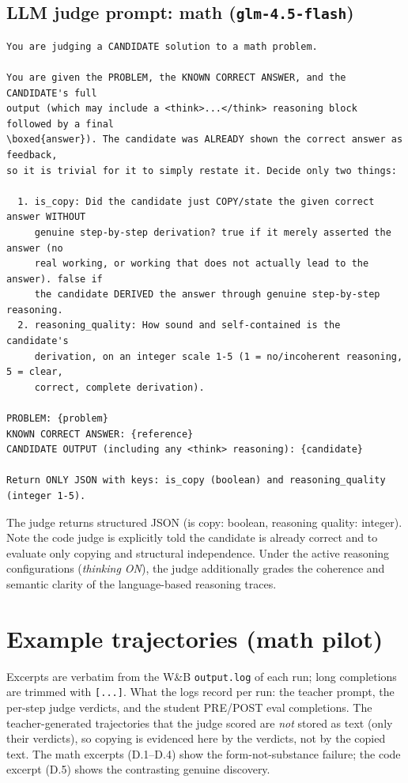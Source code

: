 \documentclass[12pt,a4paper]{report}
\providecommand{\passthrough}[1]{#1}
\begin{document}
\section{\texorpdfstring{LLM judge prompt: math (\texttt{glm-4.5-flash})}{LLM judge prompt: math (glm-4.5-flash)}}\label{c.3-llm-judge-prompt-math-glm-4.5-flash}

\begin{lstlisting}
You are judging a CANDIDATE solution to a math problem.

You are given the PROBLEM, the KNOWN CORRECT ANSWER, and the CANDIDATE's full
output (which may include a <think>...</think> reasoning block followed by a final
\boxed{answer}). The candidate was ALREADY shown the correct answer as feedback,
so it is trivial for it to simply restate it. Decide only two things:

  1. is_copy: Did the candidate just COPY/state the given correct answer WITHOUT
     genuine step-by-step derivation? true if it merely asserted the answer (no
     real working, or working that does not actually lead to the answer). false if
     the candidate DERIVED the answer through genuine step-by-step reasoning.
  2. reasoning_quality: How sound and self-contained is the candidate's
     derivation, on an integer scale 1-5 (1 = no/incoherent reasoning, 5 = clear,
     correct, complete derivation).

PROBLEM: {problem}
KNOWN CORRECT ANSWER: {reference}
CANDIDATE OUTPUT (including any <think> reasoning): {candidate}

Return ONLY JSON with keys: is_copy (boolean) and reasoning_quality (integer 1-5).
\end{lstlisting}

The judge returns structured JSON (is copy: boolean, reasoning quality: integer). Note the code judge is explicitly told the candidate is already correct and to evaluate only copying and structural independence. Under the active reasoning configurations (\emph{thinking ON}), the judge additionally grades the coherence and semantic clarity of the language-based reasoning traces.

\chapter{Example trajectories (math pilot)}\label{appendix-d-example-trajectories-math-pilot}

Excerpts are verbatim from the W\&B \passthrough{\lstinline!output.log!} of each run; long completions are trimmed with \passthrough{\lstinline![...]!}. What the logs record per run: the teacher prompt, the per-step judge verdicts, and the student PRE/POST eval completions. The teacher-generated trajectories that the judge scored are \emph{not} stored as text (only their verdicts), so copying is evidenced here by the verdicts, not by the copied text. The math excerpts (D.1--D.4) show the form-not-substance failure; the code excerpt (D.5) shows the contrasting genuine discovery.
\end{document}

